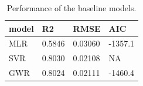 \begin{table}[t]\centering
\caption{Performance of the baseline models.}\label{tab:baseline}
\begin{tabular}{llll}
\hline
model & R2 & RMSE & AIC \\
\hline
MLR & 0.5846 & 0.03060 & -1357.1 \\
SVR & 0.8030 & 0.02108 & NA \\
GWR & 0.8024 & 0.02111 & -1460.4 \\
\hline
\end{tabular}\end{table}
